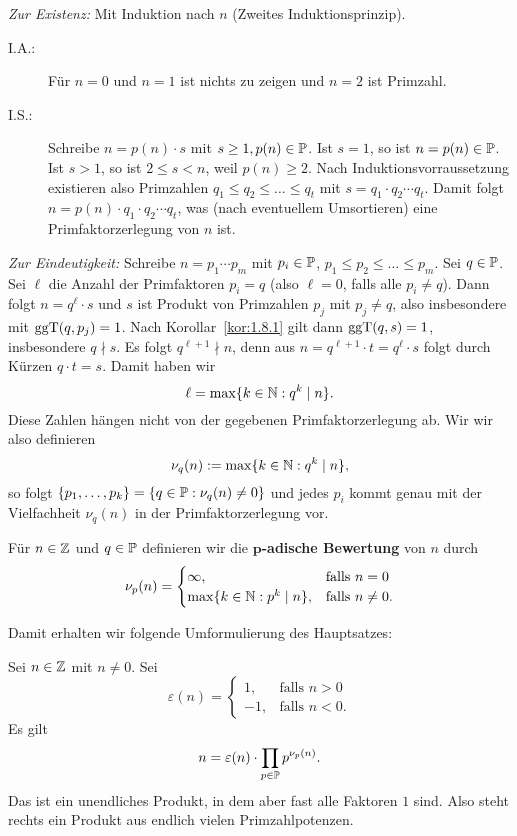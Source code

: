 	\begin{beweis}
		\textit{Zur Existenz:} Mit Induktion nach $n$ (Zweites Induktionsprinzip).
		\begin{description}
			\item[I.A.:] Für $n=0$ und $n=1$ ist nichts zu zeigen und $n=2$ ist Primzahl.
			\item[I.S.:] Schreibe $n = p(n) \cdot s$ mit $s \geq 1, p(n) \in \mathbb{P}$.
			Ist $s = 1$, so ist $n = p(n) \in \mathbb{P}$.
			Ist $s > 1$, so ist $2 \leq s < n$, weil $p(n) \geq 2$.
			Nach Induktionsvorraussetzung existieren also Primzahlen $q_1 \leq q_2 \leq \dots \leq q_t$ mit $s = q_1 \cdot q_2 \cdots q_t$.
			Damit folgt	$n = p(n) \cdot q_1 \cdot q_2 \cdots q_t$, was (nach eventuellem Umsortieren) eine Primfaktorzerlegung von $n$ ist.
		\end{description}
	
		\textit{Zur Eindeutigkeit:} Schreibe $n = p_1 \cdots p_m$ mit $p_i \in \mathbb{P}$, $p_1 \leq p_2 \leq \dots \leq p_m$. 
		Sei $q \in \mathbb{P}$.
		Sei $\ell$ die Anzahl der Primfaktoren $p_i = q$ (also $\ell = 0$, falls alle $p_i \neq q$).
		Dann folgt $n = q^\ell \cdot s$ und $s$ ist Produkt von Primzahlen $p_j$ mit $p_j \neq q$, also insbesondere mit $\operatorname{ggT}(q,p_j) = 1$.
		Nach Korollar~\ref{kor:1.8.1} gilt dann $\operatorname{ggT}(q,s) = 1$, insbesondere $q \nmid s$.
		Es folgt $q^{\ell+1} \nmid n$, denn aus $n = q^{\ell+1} \cdot t = q^{\ell} \cdot s$ folgt durch Kürzen $q \cdot t = s$.
		Damit haben wir
		\[
			\ell = \max\{k \in \mathbb{N} : q^k \mid n\}.
		\]
		Diese Zahlen hängen nicht von der gegebenen Primfaktorzerlegung ab.
		Wir wir also definieren
		\[
			\nu_q(n) := \max\{k \in \mathbb{N} : q^k \mid n\},
		\]
		so folgt $\{p_1,\dots,p_k\} = \{q \in \mathbb{P} : \nu_q(n) \neq 0\}$ und jedes $p_i$ kommt genau mit der Vielfachheit $\nu_q(n)$ in der Primfaktorzerlegung vor.
	\end{beweis}

	\begin{definition}
		\label{def:p-adisch}
		Für $n \in \mathbb{Z}$ und $q \in \mathbb{P}$ definieren wir die $\bm{p}$\textbf{-adische Bewertung} von $n$ durch 
		\[
			\nu_p(n) = \begin{cases}
				\infty, & \text{falls } n = 0 \\
				\max\{k \in \mathbb{N} : p^k \mid n\}, & \text{falls } n \neq 0.
			\end{cases}
		\]
	\end{definition}

	Damit erhalten wir folgende Umformulierung des Hauptsatzes:
	\begin{satz}
		\label{satz:fundamentalsatz_2}
		Sei $n \in \mathbb{Z}$ mit $n \neq 0$.
		Sei
		\[
			\varepsilon(n) = \begin{cases}
				1, & \text{falls } n > 0 \\
				-1, & \text{falls } n < 0.
			\end{cases}
		\]
		Es gilt
		\[
			n = \varepsilon(n) \cdot \prod_{p \in \mathbb{P}} p^{\nu_p(n)}.
		\]
		Das ist ein unendliches Produkt, in dem aber fast alle Faktoren $1$ sind.
		Also steht rechts ein Produkt aus endlich vielen Primzahlpotenzen.
	\end{satz}
	
